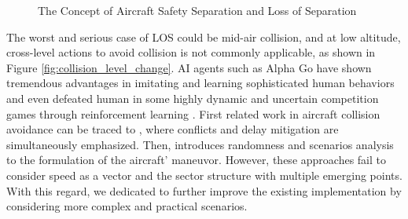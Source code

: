 \begin{figure}[H]
    \centering
    \caption{The Concept of Aircraft Safety Separation and Loss of Separation}
    \label{fig:los}
\end{figure}

The worst and serious case of LOS could be mid-air collision, and at low altitude, cross-level actions to avoid collision is not commonly applicable, as shown in Figure \ref{fig:collision_level_change}. AI agents such as Alpha Go have shown tremendous advantages in imitating and learning sophisticated human behaviors and even defeated human in some highly dynamic and uncertain competition games through reinforcement learning \citep{mnih2015human}. First related work in aircraft collision avoidance can be traced to \citep{brittain2018autonomous}, where conflicts and delay mitigation are simultaneously emphasized. Then, \cite{pham2019machine} introduces randomness and scenarios analysis to the formulation of the aircraft' maneuvor. However, these approaches fail to consider speed as a vector and the sector structure with multiple emerging points. With this regard, we dedicated to further improve the existing implementation by considering more complex and practical scenarios.


